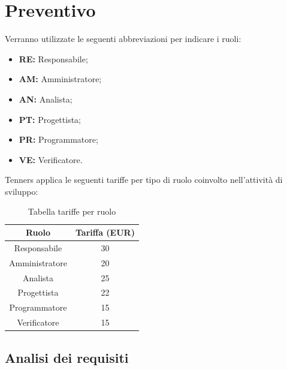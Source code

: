 \section{Preventivo}
Verranno utilizzate le seguenti abbreviazioni per indicare i ruoli:
\begin{itemize}
	\item \textbf{RE:} Responsabile;
	\item \textbf{AM:} Amministratore;
	\item \textbf{AN:} Analista;
	\item \textbf{PT:} Progettista;
	\item \textbf{PR:} Programmatore;
	\item \textbf{VE:} Verificatore.
\end{itemize}
Tenners applica le seguenti tariffe per tipo di ruolo coinvolto nell'attività di sviluppo:\\
\begin{table}[h]
\caption{Tabella tariffe per ruolo}            
\begin{center}
\begin{tabular}{ |c|c|  }
 \hline
 Ruolo 		& Tariffa (EUR)\\
 \hline\hline
	Responsabile	& 30\\
	Amministratore	& 20\\
	Analista		& 25\\
	Progettista		& 22\\
	Programmatore	& 15\\
	Verificatore	& 15\\
 \hline
\end{tabular}
\end{center}
\end{table}
\newpage
\subsection{Analisi dei requisiti}
